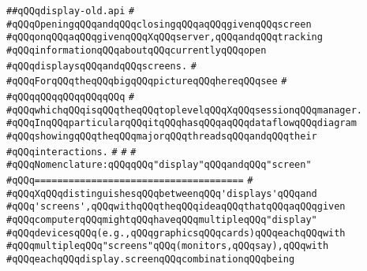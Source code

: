\label{src/lib/x-kit/xclient/src/wire/display-old.api}
\verb|##qQQqdisplay-old.api|\newline
\verb|#|\newline
\verb|#qQQqOpeningqQQqandqQQqclosingqQQqaqQQqgivenqQQqscreen|\newline
\verb|#qQQqonqQQqaqQQqgivenqQQqXqQQqserver,qQQqandqQQqtracking|\newline
\verb|#qQQqinformationqQQqaboutqQQqcurrentlyqQQqopen|\newline
\verb|#qQQqdisplaysqQQqandqQQqscreens.|\newline
\verb|#|\newline
\verb|#qQQqForqQQqtheqQQqbigqQQqpictureqQQqhereqQQqsee|\newline
\verb|#|\newline
\verb|#qQQqqQQqqQQqqQQqqQQq|\newline
\verb|#|\newline
\verb|#qQQqwhichqQQqisqQQqtheqQQqtoplevelqQQqXqQQqsessionqQQqmanager.|\newline
\verb|#qQQqInqQQqparticularqQQqitqQQqhasqQQqaqQQqdataflowqQQqdiagram|\newline
\verb|#qQQqshowingqQQqtheqQQqmajorqQQqthreadsqQQqandqQQqtheir|\newline
\verb|#qQQqinteractions.|\newline
\verb|#|\newline
\verb|#|\newline
\verb|#|\newline
\verb|#qQQqNomenclature:qQQqqQQq"display"qQQqandqQQq"screen"|\newline
\verb|#qQQq=====================================|\newline
\verb|#|\newline
\verb|#qQQqXqQQqdistinguishesqQQqbetweenqQQq'displays'qQQqand|\newline
\verb|#qQQq'screens',qQQqwithqQQqtheqQQqideaqQQqthatqQQqaqQQqgiven|\newline
\verb|#qQQqcomputerqQQqmightqQQqhaveqQQqmultipleqQQq"display"|\newline
\verb|#qQQqdevicesqQQq(e.g.,qQQqgraphicsqQQqcards)qQQqeachqQQqwith|\newline
\verb|#qQQqmultipleqQQq"screens"qQQq(monitors,qQQqsay),qQQqwith|\newline
\verb|#qQQqeachqQQqdisplay.screenqQQqcombinationqQQqbeing|\newline
